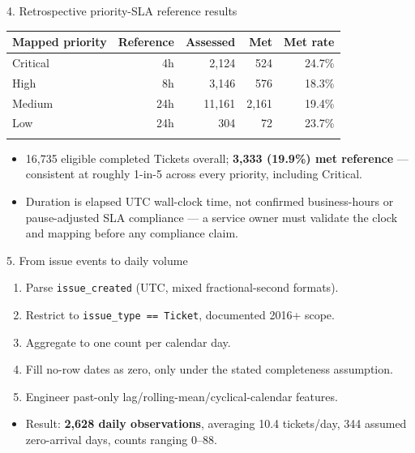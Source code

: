 \documentclass[
  ignorenonframetext,
]{beamer}
\newcounter{none} %
\providecommand{\tightlist}{%
  \setlength{\itemsep}{0pt}\setlength{\parskip}{0pt}}
\begin{document}
\begin{frame}
\begin{block}{4. Retrospective priority-SLA reference results}
\protect{}\label{4-retrospective-priority-sla-reference-results}
{\def\LTcaptype{none} %
\begin{longtable}[]{@{}lrrrr@{}}
\toprule\noalign{}
Mapped priority & Reference & Assessed & Met & Met rate \\
\midrule\noalign{}
\endhead
Critical & 4h & 2,124 & 524 & 24.7\% \\
High & 8h & 3,146 & 576 & 18.3\% \\
Medium & 24h & 11,161 & 2,161 & 19.4\% \\
Low & 24h & 304 & 72 & 23.7\% \\
\bottomrule\noalign{}
\end{longtable}
}

\begin{itemize}
\tightlist
\item
  16,735 eligible completed Tickets overall; \textbf{3,333 (19.9\%) met
  reference} --- consistent at roughly 1-in-5 across every priority,
  including Critical.
\item
  Duration is elapsed UTC wall-clock time, not confirmed business-hours
  or pause-adjusted SLA compliance --- a service owner must validate the
  clock and mapping before any compliance claim.
\end{itemize}
\end{block}
\end{frame}

\begin{frame}[fragile]
\begin{block}{5. From issue events to daily volume}
\protect{}\label{5-from-issue-events-to-daily-volume}
\begin{enumerate}
\tightlist
\item
  Parse \texttt{issue\_created} (UTC, mixed fractional-second formats).
\item
  Restrict to \texttt{issue\_type\ ==\ Ticket}, documented 2016+ scope.
\item
  Aggregate to one count per calendar day.
\item
  Fill no-row dates as zero, only under the stated completeness
  assumption.
\item
  Engineer past-only lag/rolling-mean/cyclical-calendar features.
\end{enumerate}

\begin{itemize}
\tightlist
\item
  Result: \textbf{2,628 daily observations}, averaging 10.4 tickets/day,
  344 assumed zero-arrival days, counts ranging 0--88.
\end{itemize}
\end{block}
\end{frame}
\end{document}
